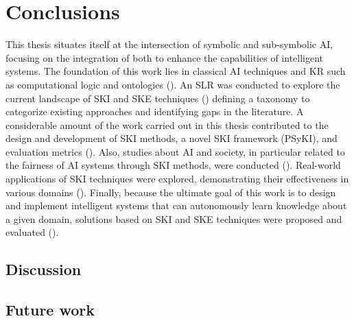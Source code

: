 
\chapter{Conclusions}
\label{ch:conclusions}
\minitoc

This thesis situates itself at the intersection of symbolic and sub-symbolic \gls{AI}, focusing on the integration of both to enhance the capabilities of intelligent systems.
%
The foundation of this work lies in classical \gls{AI} techniques and \gls{KR} such as computational logic and ontologies ().
%
An \gls{SLR} was conducted to explore the current landscape of \gls{SKI} and \gls{SKE} techniques () defining a taxonomy to categorize existing approaches and identifying gaps in the literature.
%
A considerable amount of the work carried out in this thesis contributed to the design and development of \gls{SKI} methods, a novel \gls{SKI} framework (\gls{PSyKI}), and evaluation metrics ().
%
Also, studies about \gls{AI} and society, in particular related to the fairness of \gls{AI} systems through \gls{SKI} methods, were conducted ().
%
Real-world applications of \gls{SKI} techniques were explored, demonstrating their effectiveness in various domains ().
%
Finally, because the ultimate goal of this work is to design and implement intelligent systems that can autonomously learn knowledge about a given domain, solutions based on \gls{SKI} and \gls{SKE} techniques were proposed and evaluated ().


\section{Discussion}\label{sec:discussion}

\section{Future work}\label{sec:future-work}
